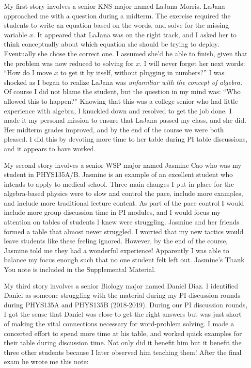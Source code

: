 \documentclass[../../main.tex]{subfiles}
\begin{document}
My first story involves a senior KNS major named LaJana Morris.  LaJana approached me with a question during a midterm.  The exercise required the students to write an equation based on the words, and solve for the missing variable $x$.  It appeared that LaJana was on the right track, and I asked her to think conceptually about which equation she should be trying to deploy.  Eventually she chose the correct one.  I assumed she'd be able to finish, given that the problem was now reduced to solving for $x$.  I will never forget her next words: ``How do I move $x$ to get it by itself, without plugging in numbers?''  I was shocked as I began to realize LaJana was \textit{unfamiliar with the concept of algebra.}  Of course I did not blame the student, but the question in my mind was: ``Who allowed this to happen?''  Knowing that this was a college senior who had little experience with algebra, I knuckled down and resolved to get the job done.  I made it my personal mission to ensure that LaJana passed my class, and she did.  Her midterm grades improved, and by the end of the course we were both pleased.  I did this by devoting more time to her table during PI table discussions, and it appears to have worked.  \\ \hspace{0.1cm}

My second story involves a senior WSP major named Jasmine Cao who was my student in PHYS135A/B.  Jasmine is an example of an excellent student who intends to apply to medical school.  Three main changes I put in place for the algebra-based physics were to slow and control the pace, include more examples, and include more traditional lecture content.  As part of the pace control I would include more group discussion time in PI modules, and I would focus my attention on tables of students I knew were struggling.  Jasmine and her friends formed a table that almost never struggled.  I worried that my new tactics would leave students like these feeling ignored.  However, by the end of the course, Jasmine told me they had a wonderful experience!  Apparently I was able to balance my focus enough such that no one student felt left out.  Jasmine's Thank You note is included in the Supplemental Material.  \\ \hspace{0.1cm}

My third story involves a senior Biology major named Daniel Diaz.  I identified Daniel as someone struggling with the material during my PI discussion rounds during PHYS135A and PHYS135B (2018-2019).  During our PI discussion rounds, I got the sense that Daniel was close to get the right answers but was just short of making the vital connections necessary for word-problem solving.  I made a concerted effort to spend more time at his table, and worked quick examples for their table during discussion time.  Not only did it benefit him but it benefit the three other students because I later observed him teaching them!  After the final exam he wrote me this note: \\ \hspace{0.1cm}
\end{document}
